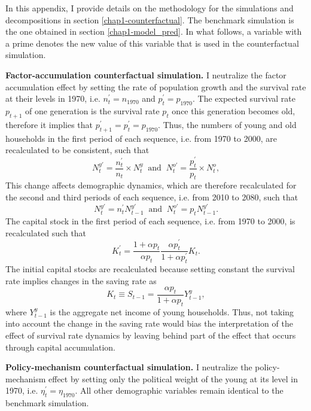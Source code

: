In this appendix, I provide details on the methodology for the simulations and decompositions in section \ref{chap1-counterfactual}. The benchmark simulation is the one obtained in section \ref{chap1-model_pred}. In what follows, a variable with a prime denotes the new value of this variable that is used in the counterfactual simulation. 

\textbf{Factor-accumulation counterfactual simulation.} I neutralize the factor accumulation effect by setting the rate of population growth and the survival rate at their levels in 1970, i.e. $n^\prime_t = n_{1970}$ and $p^\prime_t = p_{1970}$.
The expected survival rate $p_{t+1}$ of one generation is the survival rate $p_t$ once this generation becomes old, therefore it implies that $p_{t+1}^\prime = p_t^\prime = p_{1970}$.
Thus, the numbers of young and old households in the first period of each sequence, i.e. from 1970 to 2000, are recalculated to be consistent, such that
\begin{equation*}
    N_t^{y\prime} = \frac{n^\prime_t}{n_t} \times N_t^y  ~\text{ and }~    N_t^{o\prime} = \frac{p^\prime_t}{p_t} \times N_t^o,
\end{equation*}
This change affects demographic dynamics, which are therefore recalculated for the second and third periods of each sequence, i.e. from 2010 to 2080, such that
\begin{equation*}
    N_t^{y\prime} = n^\prime_t N_{t-1}^{y\prime} ~\text{ and }~    N_t^{o\prime} = p_t N_{t-1}^{y\prime}.
\end{equation*}
The capital stock in the first period of each sequence, i.e. from 1970 to 2000, is recalculated such that
\begin{equation*}
    K_t^\prime = \frac{1+\alpha p_t}{\alpha p_t}\frac{\alpha p_t^\prime}{1+\alpha p_t^\prime} K_t.
\end{equation*}
The initial capital stocks are recalculated because setting constant the survival rate implies changes in the saving rate as
\begin{equation*}
    K_t \equiv S_{t-1} = \frac{\alpha p_t}{1+\alpha p_t} Y^y_{t-1},
\end{equation*}
where $Y^y_{t-1}$ is the aggregate net income of young households.
Thus, not taking into account the change in the saving rate would bias the interpretation of the effect of survival rate dynamics by leaving behind part of the effect that occurs through capital accumulation.

\textbf{Policy-mechanism counterfactual simulation.} I neutralize the policy-mechanism effect by setting only the political weight of the young at its level in 1970, i.e. $\eta_t^\prime = \eta_{1970}$. All other demographic variables remain identical to the benchmark simulation.

